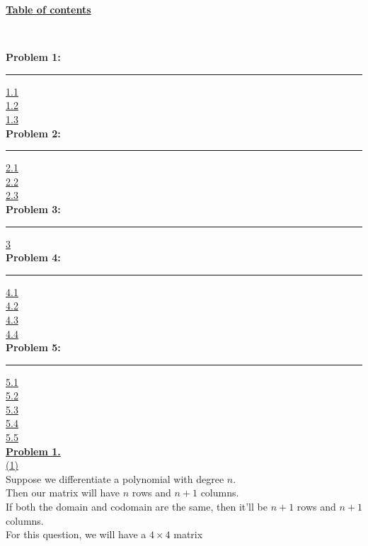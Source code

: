 \documentclass[12pt]{article}
\begin{document}
\begin{center}
	\hypertarget{toc}{\LARGE \noindent \underline{\textbf{Table of contents}}}\\
\end{center}
\textbf{Problem 1:}
\vspace{1mm}
\hrule
\vspace{1mm}
\noindent\hyperlink{1.1}{1.1}\\
\hyperlink{1.2}{1.2}\\
\hyperlink{1.3}{1.3}\\

\noindent \textbf{Problem 2:}
\vspace{1mm}
\hrule
\vspace{1mm}
\noindent\hyperlink{2.1}{2.1}\\
\hyperlink{2.2}{2.2}\\
\hyperlink{2.3}{2.3}\\

\noindent \textbf{Problem 3:}
\vspace{1mm}
\hrule
\vspace{1mm}
\noindent\hyperlink{3}{3}\\

\noindent \textbf{Problem 4:}
\vspace{1mm}
\hrule
\vspace{1mm}
\noindent\hyperlink{4.1}{4.1}\\
\hyperlink{4.2}{4.2}\\
\hyperlink{4.3}{4.3}\\
\hyperlink{4.4}{4.4}\\

\noindent \textbf{Problem 5:}
\vspace{1mm}
\hrule
\vspace{1mm}
\noindent\hyperlink{5.1}{5.1}\\
\hyperlink{5.2}{5.2}\\
\hyperlink{5.3}{5.3}\\
\hyperlink{5.4}{5.4}\\
\hyperlink{5.5}{5.5}\\
\newpage
{\LARGE \noindent \underline{\textbf{Problem 1.}}}\\

\hyperlink{toc}{\hypertarget{1.1}{(1)}}\\
Suppose we differentiate a polynomial with degree $n$.\\
Then our matrix will have $n$ rows and $n+1$ columns.\\
If both the domain and codomain are the same, then it'll be $n+1$ rows and $n+1$ columns.\\
For this question, we will have a $4\times 4$ matrix
\\\\\\\\\\\\
\end{document}
